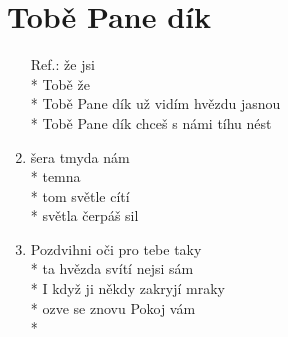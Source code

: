 \section{Tobě Pane dík}
\begin{enumerate}
\item[Ref.:]    že  jsi   \\*
Tobě   že    \\*
Tobě Pane dík už vidím hvězdu jasnou \\*
Tobě Pane dík chceš s námi tíhu nést 
\item {} šera  tmyda nám  \\*
 temna    \\*
 tom světle   cítí \\*
světla čerpáš  sil 
\item Pozdvihni oči pro tebe taky \\*
ta hvězda svítí nejsi sám \\*
I když ji někdy zakryjí mraky \\*
ozve se znovu Pokoj vám \\*
\end{enumerate}
